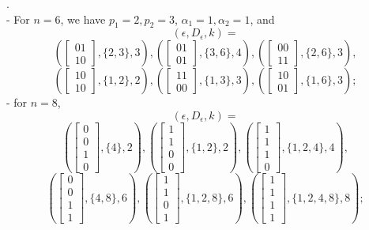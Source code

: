 \documentclass{amsart}
\numberwithin{equation}{section}
\theoremstyle{definition}
\begin{document}
\bigskip

.\\- For $n=6$, we have $p_1=2, p_2=3$, $\alpha_1=1, \alpha_2=1$, and
$$(\epsilon,D_\epsilon,k)=$$$$\left(\left[\begin{array}{l}01\\10\end{array}\right],\{2,3\},3\right),\left(\left[\begin{array}{l}01\\01\end{array}\right],\{3,6\},4\right),\left(\left[\begin{array}{l}00\\11\end{array}\right],\{2,6\},3\right),$$$$\left(\left[\begin{array}{l}10\\10\end{array}\right],\{1,2\},2\right),\left(\left[\begin{array}{l}11\\00\end{array}\right],\{1,3\},3\right),\left(\left[\begin{array}{l}10\\01\end{array}\right],\{1,6\},3\right);$$
- for $n=8$, $$(\epsilon,D_\epsilon,k)=$$$$\left(\left[\begin{array}{l}0\\0\\1\\0\end{array}\right],\{4\},2\right),\left(\left[\begin{array}{l}1\\1\\0\\0\end{array}\right],\{1,2\},2\right),\left(\left[\begin{array}{l}1\\1\\1\\0\end{array}\right],\{1,2,4\},4\right),$$$$\left(\left[\begin{array}{l}0\\0\\1\\1\end{array}\right],\{4,8\},6\right),\left(\left[\begin{array}{l}1\\1\\0\\1\end{array}\right],\{1,2,8\},6\right),\left(\left[\begin{array}{l}1\\1\\1\\1\end{array}\right],\{1,2,4,8\},8\right);$$
\end{document}
